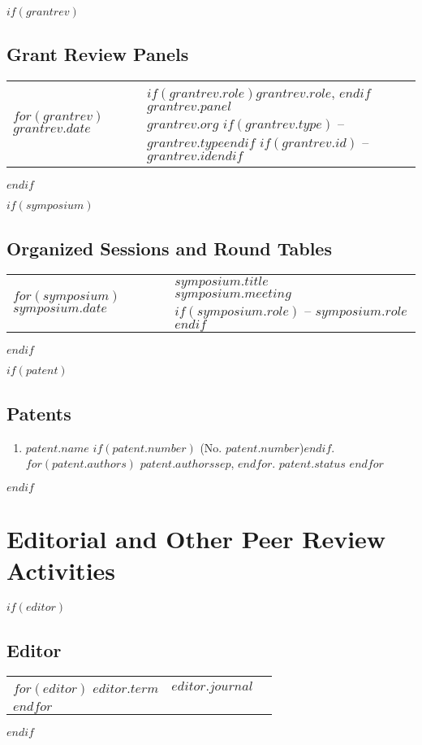 \documentclass[martgin, line]{article}
\begin{document}
$if(grantrev)$
\subsection*{Grant Review Panels}
\setlength{\extrarowheight}{.75em}
\begin{tabular}{lp{5.5in}}   
$for(grantrev)$
$grantrev.date$&
\parbox[t]{5.5in}{
  $if(grantrev.role)$$grantrev.role$, $endif$ 
  $grantrev.panel$\\
  \textit{$grantrev.org$}
  $if(grantrev.type)$ -- \textit{$grantrev.type$}$endif$
  $if(grantrev.id)$ -- \textit{$grantrev.id$}$endif$
  }\\
$endfor$
\end{tabular}
\setlength{\extrarowheight}{0em}
$endif$

$if(symposium)$
\subsection*{Organized Sessions and Round Tables}
\setlength{\extrarowheight}{.75em}
\begin{tabular}{lp{5.5in}}   
$for(symposium)$
$symposium.date$&
\parbox[t]{5.5in}{
    $symposium.title$\\
  \textit{$symposium.meeting$}
  $if(symposium.role)$ -- $symposium.role$$endif$ 
  }\\
$endfor$
\end{tabular}
\setlength{\extrarowheight}{0em}
$endif$

$if(patent)$
\subsection*{Patents}
\begin{enumerate}
  $for(patent)$
  \item
  $patent.name$
  $if(patent.number)$ (No. $patent.number$)$endif$.
  $for(patent.authors)$
  $patent.authors$$sep$,
  $endfor$.
  \textit{$patent.status$}
  $endfor$
\end{enumerate}
$endif$

\section*{Editorial and Other Peer Review Activities}

$if(editor)$
\subsection*{Editor}
\begin{tabular}{lll}
$for(editor)$
$editor.term$&
$editor.journal$
\\
$endfor$
\end{tabular}
$endif$
\end{document}
